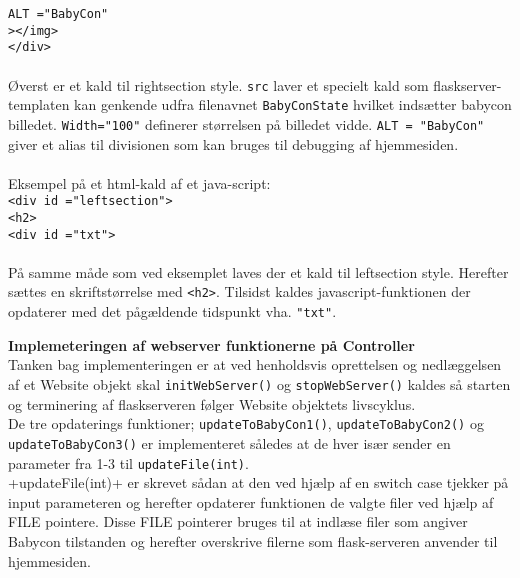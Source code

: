 \verb+ALT ="BabyCon"+\\
\verb+></img>+\\
\verb+</div>+\\
\\Øverst er et kald til rightsection style. \verb+src+ laver et specielt kald som flaskserver-templaten kan genkende udfra filenavnet \verb+BabyConState+ hvilket indsætter babycon billedet. \verb+Width="100"+ definerer størrelsen på billedet vidde. \verb+ALT = "BabyCon"+ giver et alias til divisionen som kan bruges til debugging af hjemmesiden.\\
\\Eksempel på et html-kald af et java-script:\\
\verb+<div id ="leftsection">+ \\
\verb+<h2>+ \\
\verb+<div id ="txt">+ \\
\\På samme måde som ved eksemplet laves der et kald til leftsection style. Herefter sættes en skriftstørrelse med \verb+<h2>+. Tilsidst kaldes javascript-funktionen der opdaterer med det pågældende tidspunkt vha. \verb+"txt"+.

\textbf{Implemeteringen af webserver funktionerne på Controller} \\
Tanken bag implementeringen er at ved henholdsvis oprettelsen og nedlæggelsen af et Website objekt skal \verb+initWebServer()+ og \verb+stopWebServer()+ kaldes så starten og terminering af flaskserveren følger Website objektets livscyklus. \\ 
De tre opdaterings funktioner; \verb+updateToBabyCon1()+, \verb+updateToBabyCon2()+ og \verb+updateToBabyCon3()+ er implementeret således at de hver især sender en parameter fra 1-3 til \verb+updateFile(int)+. \\ 
+updateFile(int)+ er skrevet sådan at den ved hjælp af en switch case tjekker på input parameteren og herefter opdaterer funktionen de valgte filer ved hjælp af FILE pointere. Disse FILE pointerer bruges til at indlæse filer som angiver Babycon tilstanden og herefter overskrive filerne som flask-serveren anvender til hjemmesiden.
